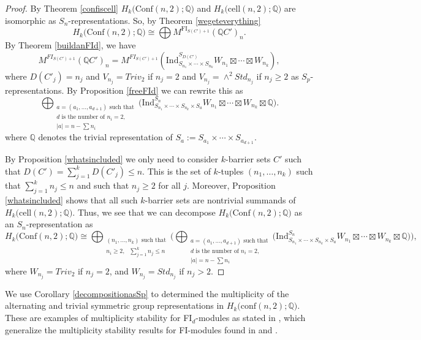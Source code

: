 \documentclass[12py]{amsart}%
\theoremstyle{definition}\newtheorem{definition}[thm]{Definition}
\theoremstyle{definition}
\newcommand{\Q}{\ensuremath{\mathbb{Q}}}
\begin{document}
\begin{proof}
By Theorem \ref{confiscell} $H_{k}\big(\text{Conf}(n,2);\Q\big)$ and $H_{k}\big(\text{cell}(n,2);\Q\big)$ are isomorphic as $S_{n}$-representations. So, by Theorem \ref{wegeteverything}
\[
H_{k}\big(\text{Conf}(n,2);\Q\big)\cong\bigoplus M^{\text{FI}_{S(C')+1}}(\Q C')_{n}.
\]
By Theorem \ref{buildanFId}, we have
\[
M^{FI_{S(C')+1}}(\Q C')_{n}=M^{FI_{S(C')+1}}\left(\text{Ind}^{S_{D(C')}}_{S_{n_{1}}\times\cdots\times S_{n_{k}}}W_{n_{1}}\boxtimes\cdots\boxtimes W_{n_{k}}\right),
\]
where $D(C'_{j})=n_{j}$ and $V_{n_{j}}=Triv_{2}$ if $n_{j}=2$ and $V_{n_{j}}=\wedge^{2}Std_{n_{j}}$ if $n_{j}\ge 2$ as $S_{p}$-representations. By Proposition \ref{freeFId} we can rewrite this as
\[
\bigoplus_{\substack{a=(a_{1},\dots, a_{d+1})\text{ such that}\\d\text{ is the number of }n_{i}=2,\\|a|= n-\sum n_{i}}}\big(\text{Ind}^{S_{n}}_{S_{n_{1}}\times\cdots\times S_{n_{k}}\times S_{a}}W_{n_{1}}\boxtimes\cdots\boxtimes W_{n_{k}}\boxtimes \Q\big).
\]
where $\Q$ denotes the trivial representation of $S_{a}:=S_{a_{1}}\times\cdots \times S_{a_{d+1}}$.

By Proposition \ref{whatsincluded} we only need to consider $k$-barrier sets $C'$ such that $D(C')=\sum_{j=1}^{k}D(C'_{j})\le n$. This is the set of $k$-tuples $(n_{1},\dots, n_{k})$ such that $\sum_{j=1}^{k}n_{j}\le n$ and such that $n_{j}\ge 2$ for all $j$. Moreover, Proposition \ref{whatsincluded} shows that all such $k$-barrier sets are nontrivial summands of $H_{k}\big(\text{cell}(n,2);\Q\big)$. Thus, we see that we can decompose $H_{k}(\text{Conf}(n,2);\Q\big)$ as an $S_{n}$-representation as
\[
H_{k}\big(\text{Conf}(n,2);\Q\big)\cong\bigoplus_{\substack{(n_{1},\dots, n_{k})\text{ such that}\\n_{i}\ge 2,\text{ }\sum_{j=1}^{k}n_{j}\le n}}\Big(\bigoplus_{\substack{a=(a_{1},\dots, a_{d+1})\text{ such that}\\d\text{ is the number of }n_{i}=2,\\|a|= n-\sum n_{i}}}\big(\text{Ind}^{S_{n}}_{S_{n_{1}}\times\cdots\times S_{n_{k}}\times S_{a}}W_{n_{1}}\boxtimes\cdots\boxtimes W_{n_{k}}\boxtimes \Q\big)\Big),
\]
where $W_{n_{j}}=Triv_{2}$ if $n_{j}=2$, and $W_{n_{j}}=Std_{n_{j}}$ if $n_{j}>2$.

\end{proof}

We use Corollary \ref{decompositionasSp} to determined the multiplicity of the alternating and trivial symmetric group representations in $H_{k}\big(\text{conf}(n,2);\Q\big)$. These are examples of multiplicity stability for FI$_{d}$-modules as stated in \cite{ramos2017generalized}, which generalize the multiplicity stability results for FI-modules found in \cite{church2015fi} and \cite{church2014fi}.
\end{document}
